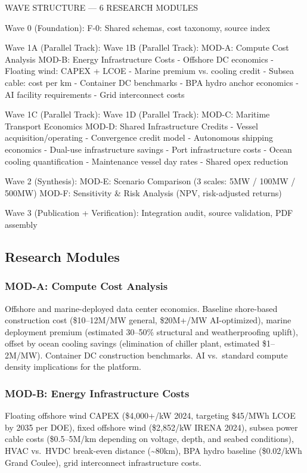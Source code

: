 \documentclass[11pt,letterpaper]{article}
\begin{document}
\begin{asciibox}
WAVE STRUCTURE --- 6 RESEARCH MODULES

Wave 0 (Foundation):
  F-0: Shared schemas, cost taxonomy, source index

Wave 1A (Parallel Track):              Wave 1B (Parallel Track):
  MOD-A: Compute Cost Analysis           MOD-B: Energy Infrastructure Costs
  - Offshore DC economics                - Floating wind: CAPEX + LCOE
  - Marine premium vs. cooling credit    - Subsea cable: cost per km
  - Container DC benchmarks              - BPA hydro anchor economics
  - AI facility requirements             - Grid interconnect costs

Wave 1C (Parallel Track):              Wave 1D (Parallel Track):
  MOD-C: Maritime Transport Economics    MOD-D: Shared Infrastructure Credits
  - Vessel acquisition/operating         - Convergence credit model
  - Autonomous shipping economics        - Dual-use infrastructure savings
  - Port infrastructure costs            - Ocean cooling quantification
  - Maintenance vessel day rates         - Shared opex reduction

Wave 2 (Synthesis):
  MOD-E: Scenario Comparison (3 scales: 5MW / 100MW / 500MW)
  MOD-F: Sensitivity & Risk Analysis (NPV, risk-adjusted returns)

Wave 3 (Publication + Verification):
  Integration audit, source validation, PDF assembly
\end{asciibox}

\subsection{Research Modules}

\subsubsection{MOD-A: Compute Cost Analysis}
Offshore and marine-deployed data center economics. Baseline shore-based construction cost
(\$10--12M/MW general, \$20M+/MW AI-optimized), marine deployment premium (estimated 30--50\%
structural and weatherproofing uplift), offset by ocean cooling savings (elimination of
chiller plant, estimated \$1--2M/MW). Container DC construction benchmarks. AI vs.\ standard
compute density implications for the platform.

\subsubsection{MOD-B: Energy Infrastructure Costs}
Floating offshore wind CAPEX (\$4,000+/kW 2024, targeting \$45/MWh LCOE by 2035 per DOE),
fixed offshore wind (\$2,852/kW IRENA 2024), subsea power cable costs (\$0.5--5M/km depending
on voltage, depth, and seabed conditions), HVAC vs.\ HVDC break-even distance (\textasciitilde{}80km),
BPA hydro baseline (\$0.02/kWh Grand Coulee), grid interconnect infrastructure costs.
\end{document}
